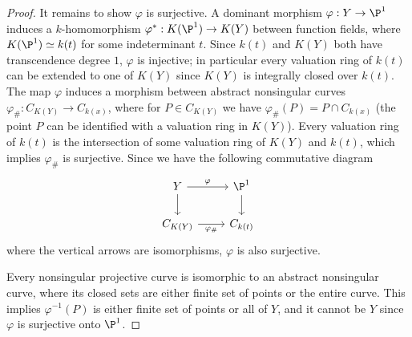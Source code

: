 \documentclass[a4paper]{article}
\begin{document}
\begin{enumerate} [label=\textbf{\arabic*.}, leftmargin=0cm]
\begin{proof}
  It remains to show $\varphi$ is surjective. A dominant morphism $\varphi : Y \to \P^1$ induces a $k$-homomorphism $\varphi^* : K(\P^1) \to K(Y)$ between function fields, where $K(\P^1) \simeq k(t)$ for some indeterminant $t$.
  Since $k(t)$ and $K(Y)$ both have transcendence degree $1$, $\varphi$ is injective; in particular every valuation ring of $k(t)$ can be extended to one of $K(Y)$ since $K(Y)$ is integrally closed over $k(t)$.
  The map $\varphi$ induces a morphism between abstract nonsingular curves $\varphi_\# : C_{K(Y)} \to C_{k(x)}$, where for $P \in C_{K(Y)}$ we have $\varphi_\# (P) = P \cap C_{k(x)}$ (the point $P$ can be identified with a valuation ring in $K(Y)$).
  Every valuation ring of $k(t)$ is the intersection of some valuation ring of $K(Y)$ and $k(t)$, which implies $\varphi_\#$ is surjective.
  Since we have the following commutative diagram
  \[ \begin{tikzcd}
    Y \arrow[d] \arrow[r, "\varphi"]  & \P^1 \arrow[d] \\
    C_{K(Y)} \arrow[r, "\varphi_\#"'] & C_{k(t)}       
    \end{tikzcd} \]
  where the vertical arrows are isomorphisms, $\varphi$ is also surjective.

  Every nonsingular projective curve is isomorphic to an abstract nonsingular curve, where its closed sets are either finite set of points or the entire curve.
  This implies $\varphi^{-1}(P)$ is either finite set of points or all of $Y$, and it cannot be $Y$ since $\varphi$ is surjective onto $\P^1$.
\end{proof}

\end{enumerate}
\end{document}
